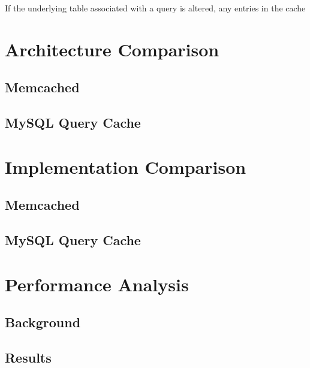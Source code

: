 \documentclass[ece]{uw-wkrpt}
\begin{document}
If the underlying table associated with a query  is altered, any entries in the cache 




\section{Architecture Comparison}
\subsection{Memcached}
\subsection{MySQL Query Cache}

\section {Implementation Comparison}
\subsection{Memcached}
\subsection{MySQL Query Cache}

\section{Performance Analysis}
\subsection{Background}
\subsection{Results}






\backmatter

%

\end{document}
